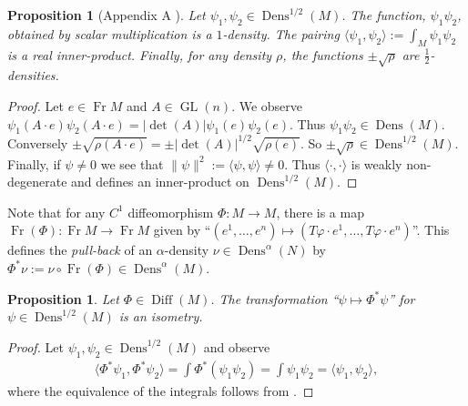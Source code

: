 \documentclass[letterpaper, 10 pt, conference]{ieeeconf}
\newtheorem{prop}[thm]{Proposition}
\DeclareMathOperator{\Diff}{Diff}
\DeclareMathOperator{\Fr}{Fr}
\DeclareMathOperator{\GL}{GL}
\DeclareMathOperator{\Dens}{Dens}
\begin{document}
  \begin{prop}[Appendix A \cite{BatesWeinstein1997}]
    Let $\psi_1,\psi_2 \in \Dens^{1/2}(M)$.
    The function, $\psi_1 \psi_2$, obtained by
    scalar multiplication is a $1$-density.
    The pairing
    $
    \langle \psi_1, \psi_2 \rangle := \int_M \psi_1 \psi_2 
    $
    is a real inner-product.
    Finally, for any density $\rho$, the functions $\pm\sqrt{\rho}$ are
    $\frac{1}{2}$-densities.
  \end{prop}
  \begin{proof}
    Let $e \in \Fr M$ and $A \in \GL(n)$.
    We observe $\psi_1(A \cdot e) \psi_2(A \cdot e) = |\det(A) | \psi_1(e) \psi_2(e)$.  Thus $\psi_1 \psi_2 \in \Dens(M)$.
    Conversely $\pm \sqrt{\rho( A \cdot e)} = \pm | \det(A) |^{1/2} \sqrt{ \rho(e)}$. So $\pm \sqrt{\rho} \in \Dens^{1/2}(M)$.
    Finally, if $\psi \neq 0$ we see that $\| \psi \|^2 := \langle \psi , \psi \rangle \neq 0$.
    Thus $\langle \cdot , \cdot \rangle$ is weakly non-degenerate
    and defines an inner-product on $\Dens^{1/2}(M)$.
  \end{proof}

  Note that for any $C^1$ diffeomorphism $\Phi:M \to M$,
  there is a map $\Fr(\Phi) : \Fr M \to \Fr M$
  given by 
  ``$(e^1,\dots,e^n) \mapsto (T\varphi \cdot e^1, \dots, T\varphi \cdot e^n)$''.
  This defines the \emph{pull-back} of an $\alpha$-density
  $\nu \in \Dens^\alpha(N)$
  by $\Phi^* \nu := \nu \circ \Fr(\Phi) \in \Dens^\alpha(M)$.
  \begin{prop} \label{prop:isom}
    Let $\Phi \in \Diff(M)$.
    The transformation ``$\psi \mapsto \Phi^* \psi$'' for
    $\psi \in \Dens^{1/2}(M)$ is an isometry.
  \end{prop}
  \begin{proof}
    Let $\psi_1,\psi_2 \in \Dens^{1/2}(M)$ and observe
    \begin{align*}
      \langle \Phi^* \psi_1, \Phi^* \psi_2 \rangle
      = \int \Phi^*( \psi_1 \psi_2)
      = \int \psi_1 \psi_2
      = \langle \psi_1, \psi_2 \rangle,
    \end{align*}
    where the equivalence of the integrals follows
    from \cite[Proposition 14.32(c)]{Lee2006}.
  \end{proof}
  
\end{document}
